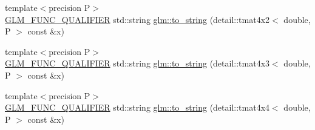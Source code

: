 \begin{DoxyCompactItemize}
\item 
{\footnotesize template$<$precision P$>$ }\\\hyperlink{setup_8hpp_a33fdea6f91c5f834105f7415e2a64407}{G\+L\+M\+\_\+\+F\+U\+N\+C\+\_\+\+Q\+U\+A\+L\+I\+F\+I\+ER} std\+::string \hyperlink{namespaceglm_a014ab0892ae1ae60db9e0b302c509478}{glm\+::to\+\_\+string} (detail\+::tmat4x2$<$ double, P $>$ const \&x)
\item 
{\footnotesize template$<$precision P$>$ }\\\hyperlink{setup_8hpp_a33fdea6f91c5f834105f7415e2a64407}{G\+L\+M\+\_\+\+F\+U\+N\+C\+\_\+\+Q\+U\+A\+L\+I\+F\+I\+ER} std\+::string \hyperlink{namespaceglm_a8c03a32a98613acfcffa00b4a39179b2}{glm\+::to\+\_\+string} (detail\+::tmat4x3$<$ double, P $>$ const \&x)
\item 
{\footnotesize template$<$precision P$>$ }\\\hyperlink{setup_8hpp_a33fdea6f91c5f834105f7415e2a64407}{G\+L\+M\+\_\+\+F\+U\+N\+C\+\_\+\+Q\+U\+A\+L\+I\+F\+I\+ER} std\+::string \hyperlink{namespaceglm_a70230acf5f1190df3a56efd0b112a3cc}{glm\+::to\+\_\+string} (detail\+::tmat4x4$<$ double, P $>$ const \&x)
\end{DoxyCompactItemize}
